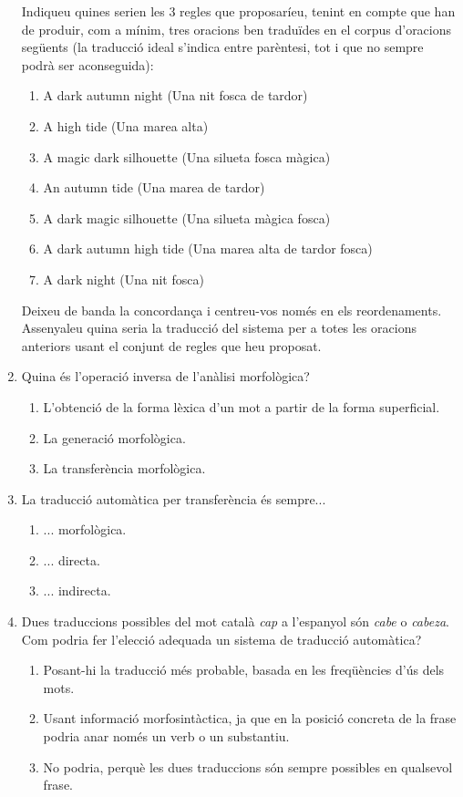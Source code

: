 \begin{enumerate}
  Indiqueu quines serien les 3 regles que proposaríeu, tenint en
  compte que han de produir, com a mínim, tres oracions ben traduïdes
  en el corpus d'oracions següents (la traducció ideal s'indica entre
  parèntesi, tot i que no sempre podrà ser aconseguida):
  \begin{enumerate}
  \item \textsf{A dark autumn night} (\textsf{Una nit fosca de
      tardor})
  \item \textsf{A high tide} (\textsf{Una marea alta}) 
  \item \textsf{A magic dark silhouette} (\textsf{Una silueta fosca
      màgica})
  \item \textsf{An autumn tide} (\textsf{Una marea de tardor})
  \item \textsf{A dark magic silhouette} (\textsf{Una silueta màgica
      fosca})
  \item \textsf{A dark autumn high tide} (\textsf{Una marea alta de
      tardor fosca})
  \item \textsf{A dark night} (\textsf{Una nit fosca})
  \end{enumerate}
    
  Deixeu de banda la concordança i centreu-vos només en els
  reordenaments. Assenyaleu quina seria la traducció del sistema per a
  totes les oracions anteriors usant el conjunt de regles que heu
  proposat.

\item Quina és l'operació inversa de l'anàlisi morfològica?
  \begin{enumerate}
  \item L'obtenció de la forma lèxica d'un mot a partir de la forma
    superficial.
  \item La generació morfològica.
  \item La transferència morfològica.
  \end{enumerate}

\item La traducció automàtica per transferència és sempre...
  \begin{enumerate}
  \item ... morfològica.
  \item ... directa.
  \item ... indirecta.
  \end{enumerate}

\item Dues traduccions possibles del mot català \emph{cap} a
  l'espanyol són \emph{cabe} o \emph{cabeza}. Com podria fer l'elecció
  adequada un sistema de traducció automàtica?
  \begin{enumerate}
  \item Posant-hi la traducció més probable, basada en les freqüències
    d'ús dels mots.
  \item Usant informació morfosintàctica, ja que en la posició
    concreta de la frase podria anar només un verb o un substantiu.
  \item No podria, perquè les dues traduccions són sempre possibles en
    qualsevol frase.
  \end{enumerate}


\end{enumerate}
